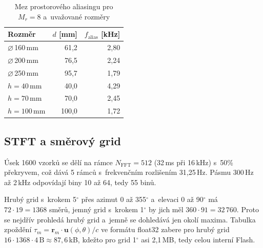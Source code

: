 \documentclass[conference]{IEEEtran}
\begin{document}
\begin{table}[t]
\centering
\caption{Mez prostorového aliasingu pro $M_r=8$ a~uvažované rozměry}
\label{tab:alias}
\begin{tabular}{@{}lrr@{}}
\toprule
Rozměr & $d$ [mm] & $f_{\mathrm{alias}}$ [kHz] \\
\midrule
$\varnothing$\,160\,mm & 61{,}2 & 2{,}80 \\
$\varnothing$\,200\,mm & 76{,}5 & 2{,}24 \\
$\varnothing$\,250\,mm & 95{,}7 & 1{,}79 \\
\midrule
$h=40$\,mm & 40{,}0 & 4{,}29 \\
$h=70$\,mm & 70{,}0 & 2{,}45 \\
$h=100$\,mm & 100{,}0 & 1{,}72 \\
\bottomrule
\end{tabular}
\end{table}

\subsection*{STFT a směrový grid}
Úsek 1600 vzorků se dělí na rámce $N_{\mathrm{FFT}}=512$ (32\,ms při 16\,kHz) s~50\% překryvem, což dává 5 rámců s~frekvenčním rozlišením 31{,}25\,Hz. Pásmu 300\,Hz až 2\,kHz odpovídají biny 10 až 64, tedy 55 binů.

Hrubý grid s~krokem 5$^\circ$ přes azimut 0 až 355$^\circ$ a~elevaci 0 až 90$^\circ$ má $72 \cdot 19 = 1368$ směrů, jemný grid s~krokem 1$^\circ$ by jich měl $360 \cdot 91 = 32\,760$. Proto se nejdřív prohledá hrubý grid a~jemně se dohledává jen okolí maxima. Tabulka zpoždění $\tau_m = \mathbf{r}_m\cdot\mathbf{u}(\phi,\theta)/c$ ve formátu float32 zabere pro hrubý grid $16 \cdot 1368 \cdot 4\,\mathrm{B} \approx 87{,}6$\,kB, kdežto pro grid 1$^\circ$ asi 2{,}1\,MB, tedy celou interní Flash.




\end{document}
